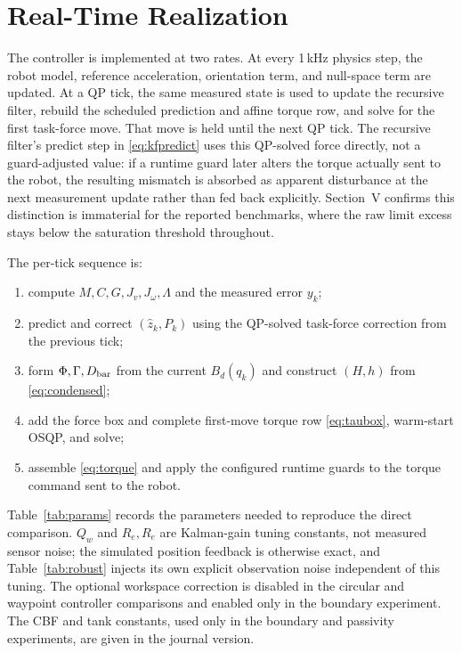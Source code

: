 \documentclass[conference]{IEEEtran}
\begin{document}
\section{Real-Time Realization}

The controller is implemented at two rates. At every 1\,kHz physics step, the
robot model, reference acceleration, orientation term, and null-space term are
updated. At a QP tick, the same measured state is used to update the recursive
filter, rebuild the scheduled prediction and affine torque row, and solve for
the first task-force move. That move is held until the next QP tick. The
recursive filter's predict step in \eqref{eq:kfpredict} uses this QP-solved force
directly, not a guard-adjusted value: if a runtime guard later alters the
torque actually sent to the robot, the resulting mismatch is absorbed as
apparent disturbance at the next measurement update rather than fed back
explicitly. Section~V confirms this distinction is immaterial for the
reported benchmarks, where the raw limit excess stays below the
saturation threshold throughout.

The per-tick sequence is:
\begin{enumerate}[leftmargin=*,itemsep=1pt,topsep=2pt]
\item compute $M,C,G,J_v,J_\omega,\Lambda$ and the measured error $y_k$;
\item predict and correct $(\hat z_k,P_k)$ using the QP-solved task-force
correction from the previous tick;
\item form $\Phi,\Gamma,D_{\rm bar}$ from the current $B_d(q_k)$ and construct
$(H,h)$ from \eqref{eq:condensed};
\item add the force box and complete first-move torque row
\eqref{eq:taubox}, warm-start OSQP, and solve;
\item assemble \eqref{eq:torque} and apply the configured runtime guards to
the torque command sent to the robot.
\end{enumerate}

Table~\ref{tab:params} records the parameters needed to reproduce the direct
comparison. $Q_w$ and $R_e,R_{\dot e}$ are Kalman-gain tuning constants, not
measured sensor noise; the simulated position feedback is otherwise exact,
and Table~\ref{tab:robust} injects its own explicit observation noise
independent of this tuning. The optional workspace correction is disabled in
the circular and waypoint controller comparisons and enabled only in the
boundary experiment. The CBF and tank constants, used only in the
boundary and passivity experiments, are given in the journal version.
\end{document}
